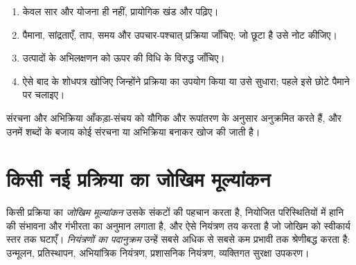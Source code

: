 \begin{method}[किसी प्रकाशित प्रक्रिया को पढ़ना]\label{met:b3:lab-techniques-3:read-paper}
\begin{enumerate}
  \item केवल सार और योजना ही नहीं, प्रायोगिक खंड और 
        पढ़िए।
  \item पैमाना, सांद्रताएँ, ताप, समय और उपचार-पश्चात् प्रक्रिया जाँचिए; जो
        छूटा है उसे नोट कीजिए।
  \item उत्पादों के अभिलक्षणन को ऊपर की विधि के विरुद्ध जाँचिए।
  \item ऐसे बाद के शोधपत्र खोजिए जिन्होंने प्रक्रिया का उपयोग किया या उसे सुधारा; पहले इसे
        छोटे पैमाने पर चलाइए।
\end{enumerate}
\end{method}

संरचना और अभिक्रिया आँकड़ा-संचय  को यौगिक और
रूपांतरण के अनुसार अनुक्रमित करते हैं, और उनमें शब्दों के बजाय कोई संरचना या अभिक्रिया
बनाकर खोज की जाती है।

\section{किसी नई प्रक्रिया का जोखिम मूल्यांकन}

\begin{definition}[जोखिम मूल्यांकन]\label{def:b3:lab-techniques-3:assessment}
किसी प्रक्रिया का \emph{जोखिम मूल्यांकन} उसके
संकटों की पहचान करता है, नियोजित परिस्थितियों में हानि की संभावना और गंभीरता का अनुमान लगाता है,
और ऐसे नियंत्रण तय करता है जो जोखिम को स्वीकार्य स्तर तक घटाएँ।
\emph{नियंत्रणों का पदानुक्रम} उन्हें सबसे अधिक से
सबसे कम प्रभावी तक श्रेणीबद्ध करता है: उन्मूलन, प्रतिस्थापन, अभियांत्रिक नियंत्रण,
प्रशासनिक नियंत्रण, व्यक्तिगत सुरक्षा उपकरण।
\end{definition}

